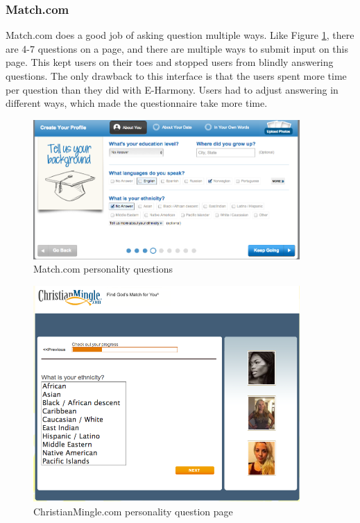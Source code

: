 \documentclass{article}
\begin{document}
\subsubsection{Match.com}
Match.com does a good job of asking question multiple ways. Like Figure \ref{Match1}, there are 4-7 questions on a page, and there are multiple ways to submit input on this page. This kept users on their toes and stopped users from blindly answering questions. The only drawback to this interface is that the users spent more time per question than they did with E-Harmony. Users had to adjust answering in different ways, which made the questionnaire take more time.  

\begin{figure}
\centering
\includegraphics[width=4in]{Match1.png} 

\caption{Match.com personality questions}
\label{Match1}
\end{figure}

\begin{figure}
\centering
\includegraphics[width=4in]{CM1.png} 

\caption{ChristianMingle.com personality question page}
\label{CM1}
\end{figure}
\end{document}
